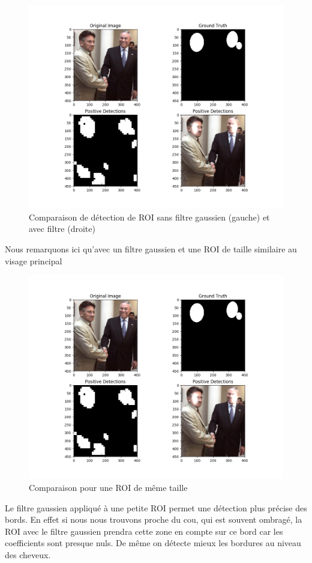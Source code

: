 \documentclass[a4paper,11pt]{article}
\begin{document}
\begin{figure}[!h]
\begin{center}
    \includegraphics[scale=0.5]{gaussian_fig1.png}
    \caption{Comparaison de détection de ROI sans filtre gaussien (gauche) et avec
     filtre (droite)}
\end{center}
\end{figure}
Nous remarquons ici qu'avec un filtre gaussien et une ROI de taille similaire au
visage principal
\begin{figure}[!h]
\begin{center}
    \includegraphics[scale=0.5]{gaussian_fig1.png}
    \caption{Comparaison pour une ROI de même taille} 
\end{center}
\end{figure}
Le filtre gaussien appliqué à une petite ROI permet une détection plus précise
des bords. En effet si nous nous trouvons proche du cou, qui est souvent
ombragé, la ROI avec le filtre gaussien prendra cette zone en compte sur ce
bord car les coefficients sont presque nuls. De même on détecte mieux les
bordures au niveau des cheveux.
\end{document}
